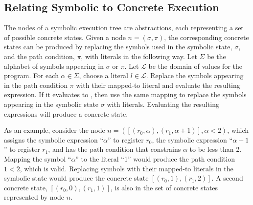 



\subsection{Relating Symbolic to Concrete Execution}
The nodes of a symbolic execution tree are abstractions, each representing a set
of possible concrete states. Given a node $n=(\sigma,\pi)$, the corresponding
concrete states can be produced by replacing the symbols used in the symbolic state,
$\sigma$, and the path condition, $\pi$, with literals in the
following way. Let $\Sigma$ be the alphabet of symbols appearing in $\sigma$
or $\pi$. Let $\mathcal{L}$ be the domain of values for the program. For
each $\alpha \in \Sigma$, choose a literal $l \in \mathcal{L}$. Replace the
symbols appearing in the path condition $\pi$ with their mapped-to literal and
evaluate the resulting expression. If it evaluates to \texttrue, then
use the same mapping to replace the symbols appearing in the symbolic state
$\sigma$ with literals. Evaluating the resulting expressions will produce a
concrete state.

As an example, consider the node $n=([(r_0,\alpha), (r_1,\alpha+1)], \alpha < 2)$,
which assigns the symbolic expression
``$\alpha$'' to register $r_0$, the symbolic expression ``$\alpha+1$'' to
register $r_1$, and has the path condition that constrains $\alpha$ to be less
than 2. Mapping the symbol ``$\alpha$'' to the literal ``1'' would produce the
path condition $1 < 2$, which is valid. Replacing symbols with their mapped-to
literals in the symbolic state would produce the concrete state $[(r_0,1),
(r_1,2)]$. A second concrete state, $[(r_0,0),(r_1,1)]$, is also in the set of
concrete states represented by node $n$.

